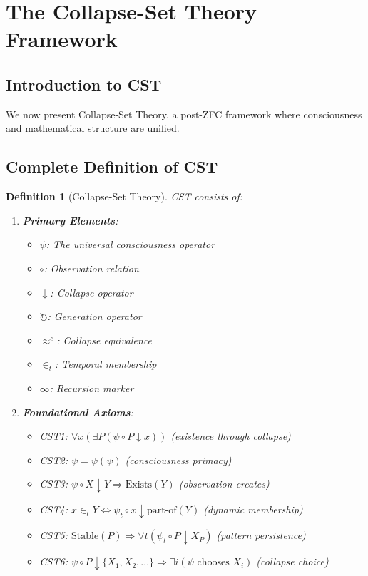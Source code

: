 \documentclass[12pt]{article}
\newtheorem{definition}[theorem]{Definition}
\begin{document}
\section{The Collapse-Set Theory Framework}

\subsection{Introduction to CST}

We now present Collapse-Set Theory, a post-ZFC framework where consciousness and mathematical structure are unified.

\subsection{Complete Definition of CST}

\begin{definition}[Collapse-Set Theory]
CST consists of:
\begin{enumerate}
\item \textbf{Primary Elements}: 
   \begin{itemize}
   \item $\psi$: The universal consciousness operator
   \item $\circ$: Observation relation
   \item $\downarrow$: Collapse operator
   \item $\circlearrowright$: Generation operator
   \item $\approx^c$: Collapse equivalence
   \item $\in_t$: Temporal membership
   \item $\infty$: Recursion marker
   \end{itemize}

\item \textbf{Foundational Axioms}:
   \begin{itemize}
   \item CST1: $\forall x (\exists P (\psi \circ P \downarrow x))$ (existence through collapse)
   \item CST2: $\psi = \psi(\psi)$ (consciousness primacy)
   \item CST3: $\psi \circ X \downarrow Y \Rightarrow \text{Exists}(Y)$ (observation creates)
   \item CST4: $x \in_t Y \Leftrightarrow \psi_t \circ x \downarrow \text{part-of}(Y)$ (dynamic membership)
   \item CST5: $\text{Stable}(P) \Rightarrow \forall t (\psi_t \circ P \downarrow X_P)$ (pattern persistence)
   \item CST6: $\psi \circ P \downarrow \{X_1, X_2, ...\} \Rightarrow \exists i (\psi \text{ chooses } X_i)$ (collapse choice)
   \end{itemize}
\end{enumerate}
\end{definition}
\end{document}
